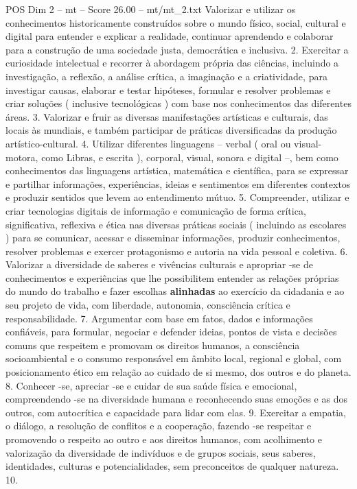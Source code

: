 \begin{textsample}{POS Dim 2 – mt – Score 26.00 – mt/mt\_2.txt}
Valorizar e utilizar os conhecimentos historicamente construídos sobre o mundo físico, social, cultural e digital para entender e explicar a realidade, continuar aprendendo e colaborar para a construção de uma sociedade justa, democrática e inclusiva. 2.
Exercitar a curiosidade intelectual e recorrer à abordagem própria das ciências, incluindo a investigação, a reflexão, a análise crítica, a imaginação e a criatividade, para investigar causas, elaborar e testar hipóteses, formular e resolver problemas e criar soluções ( inclusive tecnológicas ) com base nos conhecimentos das diferentes áreas. 3.
Valorizar e fruir as diversas manifestações artísticas e culturais, das locais às mundiais, e também participar de práticas diversificadas da produção artístico-cultural. 4.
Utilizar diferentes linguagens – verbal ( oral ou visual-motora, como Libras, e escrita ), corporal, visual, sonora e digital –, bem como conhecimentos das linguagens artística, matemática e científica, para se expressar e partilhar informações, experiências, ideias e sentimentos em diferentes contextos e produzir sentidos que levem ao entendimento mútuo. 5.
Compreender, utilizar e criar tecnologias digitais de informação e comunicação de forma crítica, significativa, reflexiva e ética nas diversas práticas sociais ( incluindo as escolares ) para se comunicar, acessar e disseminar informações, produzir conhecimentos, resolver problemas e exercer protagonismo e autoria na vida pessoal e coletiva. 6.
Valorizar a diversidade de saberes e vivências culturais e apropriar -se de conhecimentos e experiências que lhe possibilitem entender as relações próprias do mundo do trabalho e fazer escolhas \textbf{alinhadas} ao exercício da cidadania e ao seu projeto de vida, com liberdade, autonomia, consciência crítica e responsabilidade. 7.
Argumentar com base em fatos, dados e informações confiáveis, para formular, negociar e defender ideias, pontos de vista e decisões comuns que respeitem e promovam os direitos humanos, a consciência socioambiental e o consumo responsável em âmbito local, regional e global, com posicionamento ético em relação ao cuidado de si mesmo, dos outros e do planeta. 8.
Conhecer -se, apreciar -se e cuidar de sua saúde física e emocional, compreendendo -se na diversidade humana e reconhecendo suas emoções e as dos outros, com autocrítica e capacidade para lidar com elas. 9.
Exercitar a empatia, o diálogo, a resolução de conflitos e a cooperação, fazendo -se respeitar e promovendo o respeito ao outro e aos direitos humanos, com acolhimento e valorização da diversidade de indivíduos e de grupos sociais, seus saberes, identidades, culturas e potencialidades, sem preconceitos de qualquer natureza. 10.

\end{textsample}
